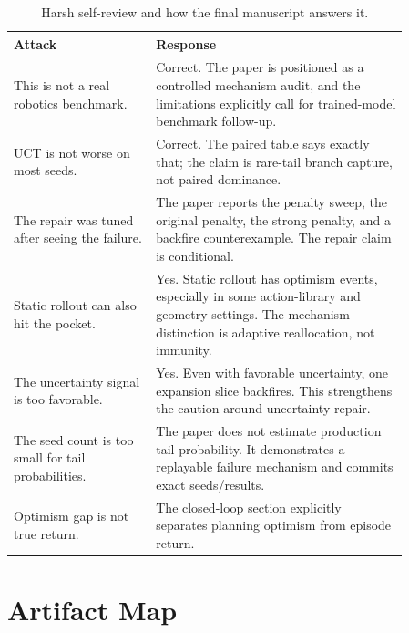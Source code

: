 \documentclass{article}
\begin{document}
\begin{table}[htbp]
\caption{Harsh self-review and how the final manuscript answers it.}
\label{tab:reviewer-attack}
\begin{center}
\small
\begin{tabular}{p{0.31\linewidth}p{0.55\linewidth}}
\toprule
Attack & Response \\
\midrule
This is not a real robotics benchmark. & Correct. The paper is positioned as a controlled mechanism audit, and the limitations explicitly call for trained-model benchmark follow-up. \\
UCT is not worse on most seeds. & Correct. The paired table says exactly that; the claim is rare-tail branch capture, not paired dominance. \\
The repair was tuned after seeing the failure. & The paper reports the penalty sweep, the original penalty, the strong penalty, and a backfire counterexample. The repair claim is conditional. \\
Static rollout can also hit the pocket. & Yes. Static rollout has optimism events, especially in some action-library and geometry settings. The mechanism distinction is adaptive reallocation, not immunity. \\
The uncertainty signal is too favorable. & Yes. Even with favorable uncertainty, one expansion slice backfires. This strengthens the caution around uncertainty repair. \\
The seed count is too small for tail probabilities. & The paper does not estimate production tail probability. It demonstrates a replayable failure mechanism and commits exact seeds/results. \\
Optimism gap is not true return. & The closed-loop section explicitly separates planning optimism from episode return. \\
\bottomrule
\end{tabular}
\end{center}
\end{table}

\section{Artifact Map}
\end{document}
